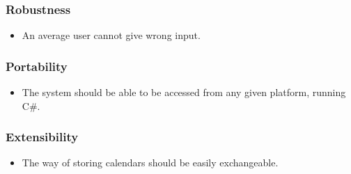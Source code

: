\documentclass[10pt]{report}
\numberwithin{equation}{section} %
\numberwithin{figure}{section} %
\numberwithin{table}{section} %
\begin{document}
\subsubsection{Robustness}
\begin{itemize}
\item An average user cannot give wrong input.
\end{itemize}
\subsubsection{Portability}
\begin{itemize}
\item The system should be able to be accessed from any given platform, running C\#.
\end{itemize}
\subsubsection{Extensibility}
\begin{itemize}
\item The way of storing calendars should be easily exchangeable.
\end{itemize}
\end{document}
